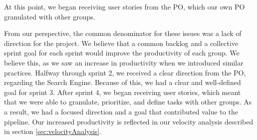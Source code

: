 At this point, we began receiving user stories from the \knox{} PO, which our own PO granulated with other \knox{} groups.

From our perspective, the common denominator for these issues was a lack of direction for the \knox{} project. We believe that a common backlog and a collective sprint goal for each \knox{} sprint would improve the productivity of each \knox{} group. We believe this, as we saw an increase in productivity when we introduced similar practices.
Halfway through sprint 2, we received a clear direction from the \knox{} PO, regarding the Search Engine. Because of this, we had a clear and well-defined goal for sprint 3.
After sprint 4, we began receiving user stories, which meant that we were able to granulate, prioritize, and define tasks with other groups. As a result, we had a focused direction and a goal that contributed value to the \knox{} pipeline.
Our increased productivity is reflected in our velocity analysis described in section \ref{sec:velocityAnalysis}.




